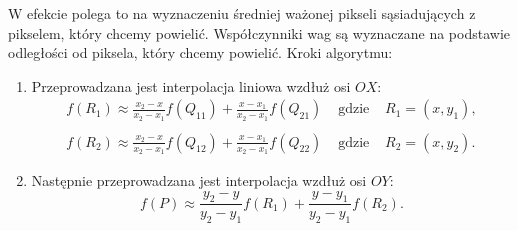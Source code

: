 W efekcie polega to na wyznaczeniu średniej ważonej pikseli sąsiadujących z pikselem, który chcemy powielić. Współczynniki wag są wyznaczane na podstawie odległości od piksela, który chcemy powielić.
Kroki algorytmu:
\begin{enumerate}
    \item Przeprowadzana jest interpolacja liniowa wzdłuż osi $O X$:
    $$
    \begin{array}{llll}
    f\left(R_1\right) \approx \frac{x_2-x}{x_2-x_1} f\left(Q_{11}\right)+\frac{x-x_1}{x_2-x_1} f\left(Q_{21}\right) & \text { gdzie } & R_1=\left(x, y_1\right), \\ \\
    f\left(R_2\right) \approx \frac{x_2-x}{x_2-x_1} f\left(Q_{12}\right)+\frac{x-x_1}{x_2-x_1} f\left(Q_{22}\right) & \text { gdzie } & R_2=\left(x, y_2\right) .
    \end{array}
    $$
    \item Następnie przeprowadzana jest interpolacja wzdłuż osi $O Y$:
    $$
    f(P) \approx \frac{y_2-y}{y_2-y_1} f\left(R_1\right)+\frac{y-y_1}{y_2-y_1} f\left(R_2\right) .
    $$
\end{enumerate}

